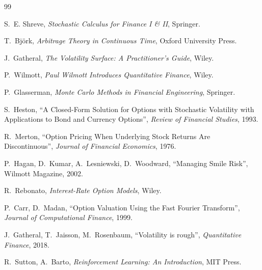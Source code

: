 \documentclass[11pt,a4paper]{report}
\newcommand{\1}{\mathbbm{1}}
\theoremstyle{definition}
\theoremstyle{plain}
\theoremstyle{remark}
\begin{document}
\begin{thebibliography}{99}

S.~E. Shreve,
\emph{Stochastic Calculus for Finance I \& II},
Springer.

T.~Bj{\"o}rk,
\emph{Arbitrage Theory in Continuous Time},
Oxford University Press.

J.~Gatheral,
\emph{The Volatility Surface: A Practitioner's Guide},
Wiley.

P.~Wilmott,
\emph{Paul Wilmott Introduces Quantitative Finance},
Wiley.

P.~Glasserman,
\emph{Monte Carlo Methods in Financial Engineering},
Springer.

S.~Heston,
``A Closed-Form Solution for Options with Stochastic Volatility with Applications to Bond and Currency Options'',
\emph{Review of Financial Studies}, 1993.

R.~Merton,
``Option Pricing When Underlying Stock Returns Are Discontinuous'',
\emph{Journal of Financial Economics}, 1976.

P.~Hagan, D.~Kumar, A.~Lesniewski, D.~Woodward,
``Managing Smile Risk'',
Wilmott Magazine, 2002.

R.~Rebonato,
\emph{Interest-Rate Option Models},
Wiley.

P.~Carr, D.~Madan,
``Option Valuation Using the Fast Fourier Transform'',
\emph{Journal of Computational Finance}, 1999.

J.~Gatheral, T.~Jaisson, M.~Rosenbaum,
``Volatility is rough'',
\emph{Quantitative Finance}, 2018.

R.~Sutton, A.~Barto,
\emph{Reinforcement Learning: An Introduction},
MIT Press.

\end{thebibliography}
\end{document}
